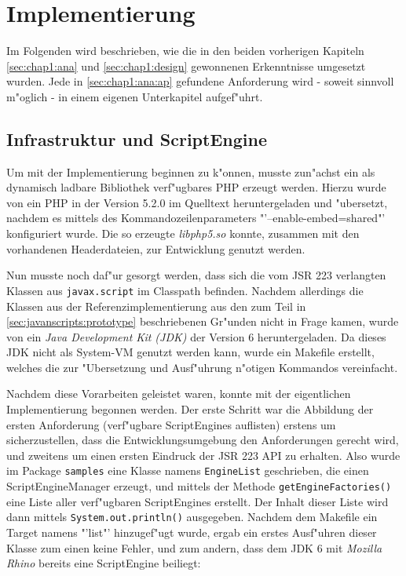 
\section{Implementierung}
\label{sec:chap1:impl}

Im Folgenden wird beschrieben, wie die in den beiden vorherigen Kapiteln \ref{sec:chap1:ana} und \ref{sec:chap1:design}
gewonnenen Erkenntnisse umgesetzt wurden. Jede in \ref{sec:chap1:ana:ap} gefundene Anforderung wird - soweit sinnvoll
m"oglich - in einem eigenen Unterkapitel aufgef"uhrt.

\subsection{Infrastruktur und ScriptEngine}
\label{sec:chap1:impl:1}

Um mit der Implementierung beginnen zu k"onnen, musste zun"achst ein als dynamisch ladbare Bibliothek verf"ugbares
PHP erzeugt werden. Hierzu wurde von \cite{PHPHP} ein PHP in der Version 5.2.0 im Quelltext heruntergeladen und 
"ubersetzt, nachdem es mittels des Kommandozeilenparameters "'--enable-embed=shared"' konfiguriert wurde. Die so
erzeugte \emph{libphp5.so} konnte, zusammen mit den vorhandenen Headerdateien, zur Entwicklung genutzt werden.

Nun musste noch daf"ur gesorgt werden, dass sich die vom JSR 223 verlangten Klassen aus \texttt{javax.script} im
Classpath befinden. Nachdem allerdings die Klassen aus der Referenzimplementierung aus den zum Teil in 
\ref{sec:javanscripts:prototype} beschriebenen Gr"unden nicht in Frage kamen, wurde von \cite{JAVAHP} ein
\emph{Java Development Kit (JDK)} der Version 6 heruntergeladen. Da dieses JDK nicht als System-VM genutzt
werden kann, wurde ein Makefile erstellt, welches die zur "Ubersetzung und Ausf"uhrung n"otigen Kommandos
vereinfacht.

Nachdem diese Vorarbeiten geleistet waren, konnte mit der eigentlichen Implementierung begonnen werden.
Der erste Schritt war die Abbildung der ersten Anforderung (verf"ugbare ScriptEngines auflisten) erstens um 
sicherzustellen, dass die Entwicklungsumgebung den Anforderungen gerecht wird, und zweitens um einen ersten
Eindruck der JSR 223 API zu erhalten. Also wurde im Package \texttt{samples} eine Klasse namens
\texttt{EngineList} geschrieben, die einen ScriptEngineManager erzeugt, und mittels der Methode
\texttt{getEngineFactories()} eine Liste aller verf"ugbaren ScriptEngines erstellt. Der Inhalt dieser
Liste wird dann mittels \texttt{System.out.println()} ausgegeben. 
Nachdem dem Makefile ein Target namens "'list"' hinzugef"ugt wurde, ergab ein erstes Ausf"uhren dieser Klasse
zum einen keine Fehler, und zum andern, dass dem JDK 6 mit \emph{Mozilla Rhino} bereits eine ScriptEngine beiliegt:

